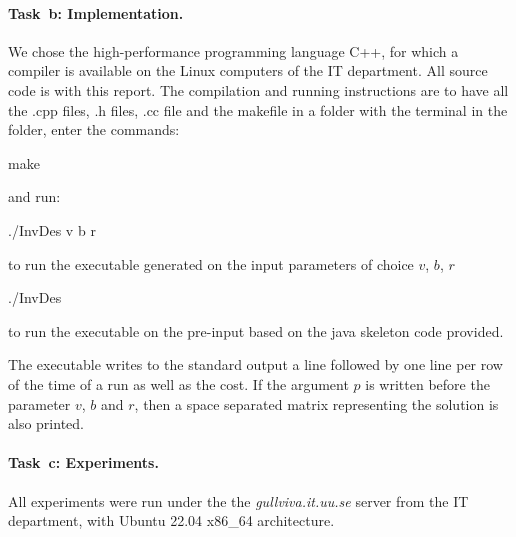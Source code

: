 \paragraph{Task~b: Implementation.}
We chose the high-performance programming language C++, for
which a compiler is available on the Linux
computers of the IT department.  All source code is 
with this report.  The compilation and running instructions are
to have all the \textsf{.cpp} files, \textsf{.h} files, \textsf{.cc} file and the makefile in a folder with the terminal in the folder, enter the commands:
\begin{center}
\textsf{make}
\end{center}
and run:
\begin{center}
\textsf{./InvDes {v} {b} {r} }
\end{center}
to run the executable generated on the input parameters of choice $v$,  $b$,  $r$
\begin{center}
\textsf{./InvDes}
\end{center}
to run the executable on the pre-input based on the java skeleton code provided. 

The executable writes to the standard output a line  followed by one line per row of the time of a run as well as the cost. If the argument $p$ is written before the parameter $v$, $b$ and $r$, then a space separated matrix representing the solution is also printed. 


\paragraph{Task~c: Experiments.}
All experiments were run under the the \textit{gullviva.it.uu.se} server from the IT department, with Ubuntu 22.04 x86\_64 architecture. 

